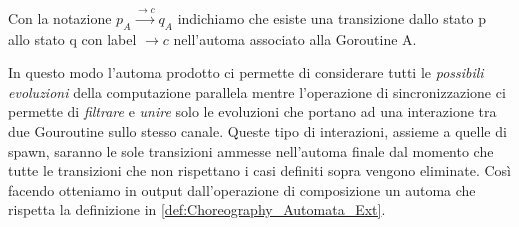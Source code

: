 \begin{remark}
    Con la notazione $p_A \xrightarrow{\rightarrow c} q_A$ indichiamo che esiste una transizione dallo stato p allo stato q con label $\rightarrow c$ nell'automa associato alla Goroutine A.
\end{remark}
In questo modo l'automa prodotto ci permette di considerare tutti le \emph{possibili evoluzioni} della computazione parallela mentre l'operazione di sincronizzazione ci permette di \emph{filtrare} e \emph{unire} solo le evoluzioni che portano ad una interazione tra due Gouroutine sullo stesso canale. Queste tipo di interazioni, assieme a quelle di spawn, saranno le sole transizioni ammesse nell'automa finale dal momento che tutte le transizioni che non rispettano i casi definiti sopra vengono eliminate. Così facendo otteniamo in output dall'operazione di composizione un automa che rispetta la definizione in \ref{def:Choreography_Automata_Ext}.